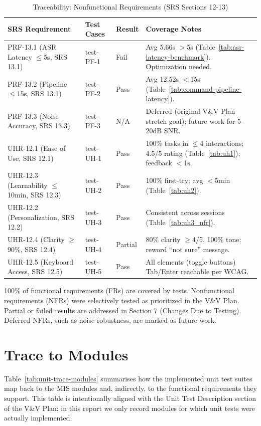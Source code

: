 \documentclass[12pt, titlepage]{article}
\begin{document}
\begin{table}[H]
\centering
\caption{Traceability: Nonfunctional Requirements (SRS Sections 12-13)}
\label{tab:trace-nfr}
\renewcommand{\arraystretch}{1.2}
\begin{tabular}{|p{3.5cm}|p{3.5cm}|p{2cm}|p{4.5cm}|}
\hline
\textbf{SRS Requirement} & \textbf{Test Cases} & \textbf{Result} & \textbf{Coverage Notes} \\
\hline
PRF-13.1 (ASR Latency $\leq$5s, SRS 13.1) & test-PF-1 & Fail & Avg 5.66s $>$5s (Table~\ref{tab:asr-latency-benchmark}). Optimization needed. \\
\hline
PRF-13.2 (Pipeline $\leq$15s, SRS 13.1) & test-PF-2 & Pass & Avg 12.52s $<$15s (Table~\ref{tab:command-pipeline-latency}). \\
\hline
PRF-13.3 (Noise Accuracy, SRS 13.3) & test-PF-3 & N/A & Deferred (original V\&V Plan stretch goal); future work for 5--20dB SNR. \\
\hline
UHR-12.1 (Ease of Use, SRS 12.1) & test-UH-1 & Pass & 100\% tasks in $\leq$4 interactions; 4.5/5 rating (Table~\ref{tab:uh1}); feedback $<$1s. \\
\hline
UHR-12.3 (Learnability $\leq$10min, SRS 12.3) & test-UH-2 & Pass & 100\% first-try; avg $<$5min (Table~\ref{tab:uh2}). \\
\hline
UHR-12.2 (Personalization, SRS 12.2) & test-UH-3 & Pass & Consistent across sessions (Table~\ref{tab:uh3_nfr}). \\
\hline
UHR-12.4 (Clarity $\geq$90\%, SRS 12.4) & test-UH-4 & Partial & 80\% clarity $\geq$4/5, 100\% tone; reword ``not sure'' message. \\
\hline
UHR-12.5 (Keyboard Access, SRS 12.5) & test-UH-5 & Pass & All elements (toggle buttons) Tab/Enter reachable per WCAG. \\
\hline
\end{tabular}
\end{table}

100\% of functional requirements (FRs) are covered by tests. Nonfunctional requirements (NFRs) were selectively tested as prioritized in the V\&V Plan. Partial or failed results are addressed in Section 7 (Changes Due to Testing). Deferred NFRs, such as noise robustness, are marked as future work.
		
\section{Trace to Modules}		

Table~\ref{tab:unit-trace-modules} summarises how the implemented unit test suites map back to the MIS modules and, indirectly, to the functional requirements they support. This table is intentionally aligned with the Unit Test Description section of the V\&V Plan; in this report we only record modules for which unit tests were actually implemented.
\end{document}
